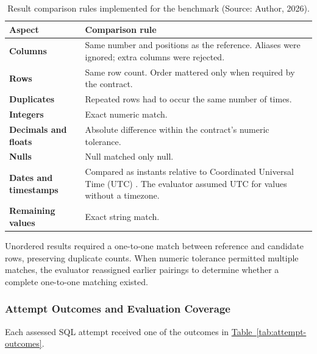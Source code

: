 \begin{table}[H]
\centering
{\small
\begin{tabularx}{\textwidth}{@{}>{\raggedright\arraybackslash\bfseries}p{}>{\raggedright\arraybackslash}X@{}}
\toprule
Aspect & \textbf{Comparison rule} \\
\midrule
Columns & Same number and positions as the reference. Aliases were ignored;
extra columns were rejected. \\
\addlinespace[0.6em]
Rows & Same row count. Order mattered only when required by the contract. \\
\addlinespace[0.6em]
Duplicates & Repeated rows had to occur the same number of times. \\
\addlinespace[0.6em]
Integers & Exact numeric match. \\
\addlinespace[0.6em]
Decimals and floats & Absolute difference within the contract's numeric tolerance. \\
\addlinespace[0.6em]
Nulls & Null matched only null. \\
\addlinespace[0.6em]
Dates and timestamps & Compared as instants relative to Coordinated Universal
Time (UTC) \citep{rfc3339}. The evaluator assumed UTC for values without a
timezone. \\
\addlinespace[0.6em]
Remaining values & Exact string match. \\
\bottomrule
\end{tabularx}
}
\caption{Result comparison rules implemented for the benchmark
(Source: Author, 2026).}
\label{tab:comparison-rules}
\end{table}

Unordered results required a one-to-one match between reference and candidate
rows, preserving duplicate counts. When numeric tolerance permitted multiple
matches, the evaluator reassigned earlier pairings to determine whether a
complete one-to-one matching existed.

\subsubsection{Attempt Outcomes and Evaluation Coverage}

Each assessed SQL attempt received one of the outcomes in
\hyperref[tab:attempt-outcomes]{Table~\ref*{tab:attempt-outcomes}}.

